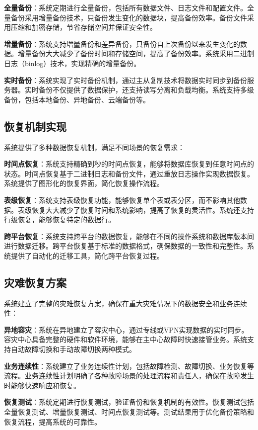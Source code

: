 \textbf{全量备份}：系统定期进行全量备份，包括所有数据文件、日志文件和配置文件。全量备份采用增量备份技术，只备份发生变化的数据块，提高备份效率。备份文件采用压缩和加密存储，节省存储空间并保证安全性。

\textbf{增量备份}：系统支持增量备份和差异备份，只备份自上次备份以来发生变化的数据。增量备份大大减少了备份时间和存储空间，提高了备份效率。系统采用二进制日志（binlog）技术，实现精确的增量备份。

\textbf{实时备份}：系统实现了实时备份机制，通过主从复制技术将数据实时同步到备份服务器。实时备份不仅提供了数据保护，还支持读写分离和负载均衡。系统支持多级备份，包括本地备份、异地备份、云端备份等。

\subsection{恢复机制实现}

系统提供了多种数据恢复机制，满足不同场景的恢复需求：

\textbf{时间点恢复}：系统支持精确到秒的时间点恢复，能够将数据库恢复到任意时间点的状态。时间点恢复基于二进制日志和备份文件，通过重放日志操作实现数据恢复。系统提供了图形化的恢复界面，简化恢复操作流程。

\textbf{表级恢复}：系统支持表级恢复功能，能够恢复单个表或表分区，而不影响其他数据。表级恢复大大减少了恢复时间和系统影响，提高了恢复的灵活性。系统还支持行级恢复，能够恢复特定的数据行。

\textbf{跨平台恢复}：系统支持跨平台的数据恢复，能够在不同的操作系统和数据库版本间进行数据迁移。跨平台恢复基于标准的数据格式，确保数据的一致性和完整性。系统提供了自动化的迁移工具，简化跨平台恢复过程。

\subsection{灾难恢复方案}

系统建立了完整的灾难恢复方案，确保在重大灾难情况下的数据安全和业务连续性：

\textbf{异地容灾}：系统在异地建立了容灾中心，通过专线或VPN实现数据的实时同步。容灾中心具备完整的硬件和软件环境，能够在主中心故障时快速接管业务。系统支持自动故障切换和手动故障切换两种模式。

\textbf{业务连续性}：系统建立了业务连续性计划，包括故障检测、故障切换、业务恢复等流程。业务连续性计划明确了各种故障场景的处理流程和责任人，确保在故障发生时能够快速响应和恢复。

\textbf{恢复测试}：系统定期进行恢复测试，验证备份和恢复机制的有效性。恢复测试包括全量恢复测试、增量恢复测试、时间点恢复测试等。测试结果用于优化备份策略和恢复流程，提高系统的可靠性。

